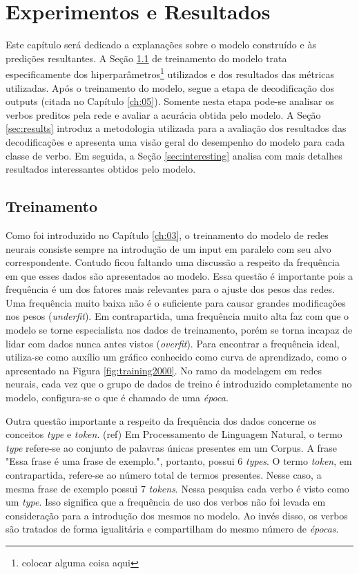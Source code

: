 \chapter{Experimentos e Resultados}
\label{ch:07}

Este capítulo será dedicado a explanações sobre o modelo construído e às predições resultantes. A Seção \ref{sec:treinamento} de treinamento do modelo trata especificamente dos hiperparâmetros\footnote{colocar alguma coisa aqui} utilizados e dos resultados das métricas utilizadas. Após o treinamento do modelo, segue a etapa de decodificação dos outputs (citada no Capítulo \ref{ch:05}). Somente nesta etapa pode-se analisar os verbos preditos pela rede e avaliar a acurácia obtida pelo modelo. A Seção \ref{sec:results} introduz a metodologia utilizada para a avaliação dos resultados das decodificações e apresenta uma visão geral do desempenho do modelo para cada classe de verbo. Em seguida, a Seção \ref{sec:interesting} analisa com mais detalhes resultados interessantes obtidos pelo modelo. 

\section{Treinamento}
\label{sec:treinamento}

Como foi introduzido no Capítulo \ref{ch:03}, o treinamento do modelo de redes neurais consiste sempre na introdução de um input em paralelo com seu alvo correspondente. Contudo ficou faltando uma discussão a respeito da frequência em que esses dados são apresentados ao modelo. Essa questão é importante pois a frequência é um dos fatores mais relevantes para o ajuste dos pesos das redes. Uma frequência muito baixa não é o suficiente para causar grandes modificações nos pesos (\textit{underfit}). Em contrapartida, uma frequência muito alta faz com que o modelo se torne especialista nos dados de treinamento, porém se torna incapaz de lidar com dados nunca antes vistos (\textit{overfit}). Para encontrar a frequência ideal, utiliza-se como auxílio um gráfico conhecido como curva de aprendizado, como o apresentado na Figura \ref{fig:training2000}. No ramo da modelagem em redes neurais, cada vez que o grupo de dados de treino é introduzido completamente no modelo, configura-se o que é chamado de uma \textit{época}. 

Outra questão importante a respeito da frequência dos dados concerne os conceitos \textit{type} e \textit{token}. (ref) %
Em Processamento de Linguagem Natural, o termo \textit{type} refere-se ao conjunto de palavras únicas presentes em um Corpus. A frase "Essa frase é uma frase de exemplo.", portanto, possui 6 \textit{types}. O termo \textit{token}, em contrapartida, refere-se ao número total de termos presentes. Nesse caso, a mesma frase de exemplo possui 7 \textit{tokens}. Nessa pesquisa cada verbo é visto como um \textit{type}. Isso significa que a frequência de uso dos verbos não foi levada em consideração para a introdução dos mesmos no modelo. Ao invés disso, os verbos são tratados de forma igualitária e compartilham do mesmo número de \textit{épocas}.

